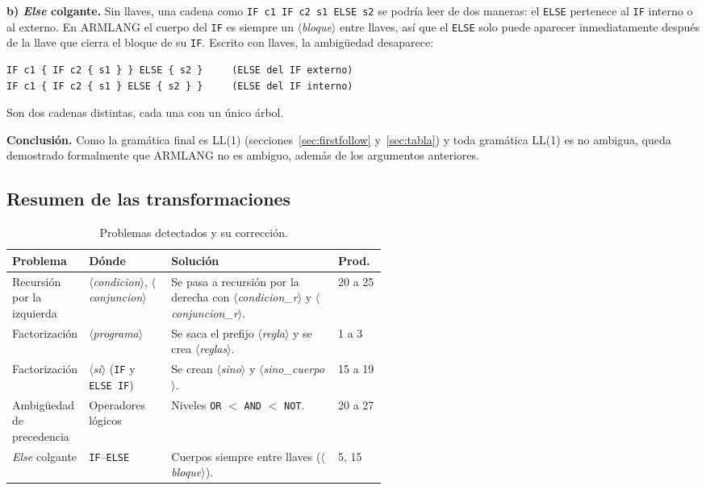 \documentclass[10pt,a4paper]{article}
\newcommand{\nt}[1]{\ensuremath{\langle}\textit{#1}\ensuremath{\rangle}}   %
\newcommand{\tm}[1]{\texttt{#1}}                                          %
\begin{document}
\textbf{b) \emph{Else} colgante.} Sin llaves, una cadena como \tm{IF c1 IF c2 s1 ELSE s2} se podría leer de
dos maneras: el \tm{ELSE} pertenece al \tm{IF} interno o al externo. En ARMLANG el cuerpo del \tm{IF} es siempre un
\nt{bloque} entre llaves, así que el \tm{ELSE} solo puede aparecer inmediatamente después de la llave que cierra el
bloque de su \tm{IF}. Escrito con llaves, la ambigüedad desaparece:

\begin{lstlisting}
IF c1 { IF c2 { s1 } } ELSE { s2 }     (ELSE del IF externo)
IF c1 { IF c2 { s1 } ELSE { s2 } }     (ELSE del IF interno)
\end{lstlisting}

Son dos cadenas distintas, cada una con un único árbol.

\textbf{Conclusión.} Como la gramática final es LL(1) (secciones~\ref{sec:firstfollow} y~\ref{sec:tabla}) y toda
gramática LL(1) es no ambigua, queda demostrado formalmente que ARMLANG no es ambiguo, además de los argumentos
anteriores.

\subsection{Resumen de las transformaciones}

\begin{table}[H]
\centering\small
\begin{tabularx}{\linewidth}{|L{0.19\linewidth}|L{0.22\linewidth}|X|L{0.13\linewidth}|}
\hline
\textbf{Problema} & \textbf{Dónde} & \textbf{Solución} & \textbf{Prod.} \\
\hline
Recursión por la izquierda & \nt{condicion}, \nt{conjuncion} & Se pasa a recursión por la derecha con \nt{condicion\_r} y \nt{conjuncion\_r}. & 20 a 25 \\
\hline
Factorización & \nt{programa} & Se saca el prefijo \nt{regla} y se crea \nt{reglas}. & 1 a 3 \\
\hline
Factorización & \nt{si} (\tm{IF} y \tm{ELSE IF}) & Se crean \nt{sino} y \nt{sino\_cuerpo}. & 15 a 19 \\
\hline
Ambigüedad de precedencia & Operadores lógicos & Niveles \tm{OR} $<$ \tm{AND} $<$ \tm{NOT}. & 20 a 27 \\
\hline
\emph{Else} colgante & \tm{IF}--\tm{ELSE} & Cuerpos siempre entre llaves (\nt{bloque}). & 5, 15 \\
\hline
\end{tabularx}
\caption{Problemas detectados y su corrección.}
\label{tab:transformaciones}
\end{table}
\end{document}
